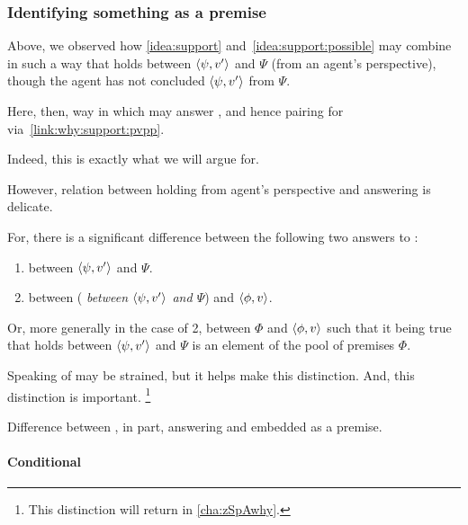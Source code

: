 \subsubsection{Identifying something as a premise}
\label{cha:clarification:sec:embedding}

\begin{note}
  Above, we observed how \autoref{idea:support} and~\autoref{idea:support:possible} may combine in such a way that \support{} holds between \(\langle \psi, v' \rangle\) and \(\Psi\) (from an agent's perspective), though the agent has not concluded \(\langle \psi, v' \rangle\) from \(\Psi\).

  Here, then, way in which \support{} may answer \qWhyV{}, and hence pairing for \qWhy{} via~\autoref{link:why:support:pvpp}.

  Indeed, this is exactly what we will argue for.

  However, relation between \support{} holding from agent's perspective and \support{} answering \qWhyV{} is delicate.

  For, there is a significant difference between the following two answers to \qWhyV{}:
  \begin{enumerate}
  \item
     between \(\langle \psi, v' \rangle\) and \(\Psi\).
  \item
     between (\emph{\support{} between \(\langle \psi, v' \rangle\) and \(\Psi\)}) and \(\langle \phi, v \rangle\).
  \end{enumerate}
  Or, more generally in the case of 2, \support{} between \(\Phi\) and \(\langle \phi, v \rangle\) such that it being true that \support{} holds between \(\langle \psi, v' \rangle\) and \(\Psi\) is an element of the pool of premises \(\Phi\).

  Speaking of \support{} may be strained, but it helps make this distinction.
  And, this distinction is important.%
  \footnote{
    This distinction will return in \autoref{cha:zSpAwhy}.
  }

  Difference between \support{}, in part, answering \qWhyV{} and \support{} embedded as a premise.
\end{note}

\paragraph{Conditional}

